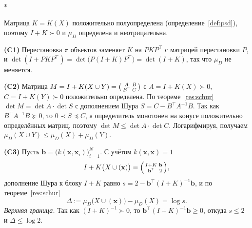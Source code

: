 \documentclass[14pt, a4paper]{extarticle}
\makeatletter
\theoremstyle{definition}
\theoremstyle{plain}
\renewenvironment{proof}[1][\proofname]{\par
    \pushQED{\qed}%
    \normalfont \topsep6\p@\@plus6\p@\relax
    \trivlist
    \item[\hskip\labelsep\itshape #1\@addpunct{.}]\mbox{}\\*
    \ignorespaces
}{\popQED\endtrivlist\@endpefalse}
\makeatother
\begin{document}
\begin{proof}[Доказательство теоремы~\ref{thm:valid}]
Матрица $K=K(X)$ положительно полуопределена (определение~\ref{def:psd}), поэтому
$I+K\succ 0$ и $\mu_D$ определена и неотрицательна.

\textbf{(C1)} Перестановка $\pi$ объектов заменяет $K$ на $PKP^{\!\top}$ с
матрицей перестановки $P$, и
$\det(I+PKP^{\!\top})=\det\!\big(P(I+K)P^{\!\top}\big)=\det(I+K)$, так что $\mu_D$
не меняется.

\textbf{(C2)} Матрица
$M=I+K(X\cup Y)=\begin{psmallmatrix}A&B\\ B^{\!\top}&C\end{psmallmatrix}$ с
$A=I+K(X)\succ0$, $C=I+K(Y)\succ0$ положительно определена. По
теореме~\ref{res:schur} $\det M=\det A\cdot\det S$ с дополнением Шура
$S=C-B^{\!\top}A^{-1}B$. Так как $B^{\!\top}A^{-1}B\succeq0$, то $0\prec S\preceq C$,
а определитель монотонен на конусе положительно определённых матриц, поэтому
$\det M\le\det A\cdot\det C$. Логарифмируя, получаем
$\mu_D(X\cup Y)\le\mu_D(X)+\mu_D(Y)$.

\textbf{(C3)} Пусть $\mathbf{b}=\big(k(\mathbf{x},\mathbf{x}_i)\big)_{i=1}^N$.
С учётом $k(\mathbf{x},\mathbf{x})=1$
\[
    I+K\big(X\cup(\mathbf{x})\big)
    =\begin{psmallmatrix}I+K&\mathbf{b}\\ \mathbf{b}^{\!\top}&2\end{psmallmatrix},
\]
дополнение Шура к блоку $I+K$ равно $s=2-\mathbf{b}^{\!\top}(I+K)^{-1}\mathbf{b}$, и по
теореме~\ref{res:schur}
\[
    \Delta:=\mu_D\big(X\cup(\mathbf{x})\big)-\mu_D(X)=\log s .
\]
\emph{Верхняя граница.} Так как $(I+K)^{-1}\succ0$, то
$\mathbf{b}^{\!\top}(I+K)^{-1}\mathbf{b}\ge0$, откуда $s\le2$ и $\Delta\le\log 2$.


\end{proof}
\end{document}
